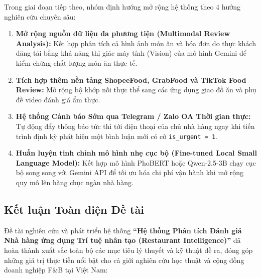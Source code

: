 \documentclass[12pt, a4paper]{article}
\begin{document}
Trong giai đoạn tiếp theo, nhóm định hướng mở rộng hệ thống theo 4 hướng nghiên cứu chuyên sâu:
\begin{enumerate}[leftmargin=1.2cm]
    \item \textbf{Mở rộng nguồn dữ liệu đa phương tiện (Multimodal Review Analysis):} Kết hợp phân tích cả hình ảnh món ăn và hóa đơn do thực khách đăng tải bằng khả năng thị giác máy tính (Vision) của mô hình Gemini để kiểm chứng chất lượng món ăn thực tế.
    \item \textbf{Tích hợp thêm nền tảng ShopeeFood, GrabFood và TikTok Food Review:} Mở rộng bộ khớp nối thực thể sang các ứng dụng giao đồ ăn và phụ đề video đánh giá ẩm thực.
    \item \textbf{Hệ thống Cảnh báo Sớm qua Telegram / Zalo OA Thời gian thực:} Tự động đẩy thông báo tức thì tới điện thoại của chủ nhà hàng ngay khi tiến trình định kỳ phát hiện một bình luận mới có cờ \texttt{is\_urgent = 1}.
    \item \textbf{Huấn luyện tinh chỉnh mô hình nhẹ cục bộ (Fine-tuned Local Small Language Model):} Kết hợp mô hình PhoBERT hoặc Qwen-2.5-3B chạy cục bộ song song với Gemini API để tối ưu hóa chi phí vận hành khi mở rộng quy mô lên hàng chục ngàn nhà hàng.
\end{enumerate}

\subsection{Kết luận Toàn diện Đề tài}
Đề tài nghiên cứu và phát triển hệ thống \textbf{``Hệ thống Phân tích Đánh giá Nhà hàng ứng dụng Trí tuệ nhân tạo (Restaurant Intelligence)''} đã hoàn thành xuất sắc toàn bộ các mục tiêu lý thuyết và kỹ thuật đề ra, đóng góp những giá trị thực tiễn nổi bật cho cả giới nghiên cứu học thuật và cộng đồng doanh nghiệp F\&B tại Việt Nam:
\end{document}
